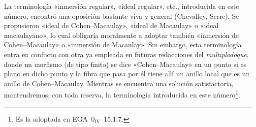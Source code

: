 \begin{remarque}
\label{II.4.19}
%
La terminología «inmersión regular», «ideal regular», etc., introducida en este número, encontró una oposición bastante viva y general (Chevalley, Serre). Se propusieron «ideal de Cohen--Macaulay», «ideal de Macaulay» o «ideal macaulayano», lo cual obligaría moralmente a adoptar también «inmersión de Cohen--Macaulay» o «inmersión de Macaulay». Sin embargo, esta terminología entra en conflicto con otra ya empleada en futuras redacciones del \emph{multiplodoque}, donde un morfismo (de tipo finito) se dice «Cohen--Macaulay» en un punto si es plano en dicho punto y la fibra que pasa por él tiene allí un anillo local que es un anillo de Cohen--Macaulay. Mientras se encuentra una solución satisfactoria, mantendremos, con toda reserva, la terminología introducida en este número\footnote{Es la adoptada en EGA~$\mathrm{0}_{\mathrm{IV}}$~15.1.7.}.
\end{remarque}
